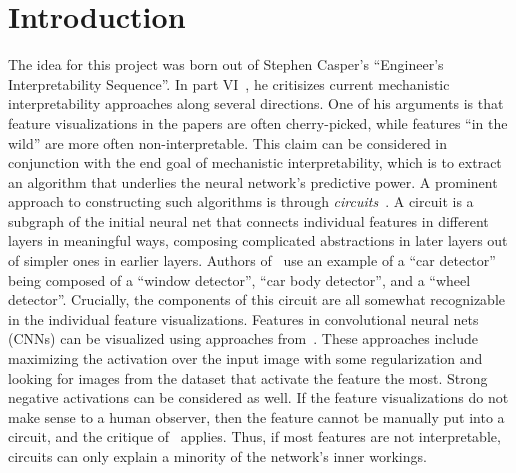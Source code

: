 \documentclass[12pt]{article}
\begin{document}
\section{Introduction}
The idea for this project was born out of Stephen Casper's ``Engineer's Interpretability Sequence''. In part VI~\cite{cas2023interpretability}, he critisizes current mechanistic interpretability approaches along several directions. One of his arguments is that feature visualizations in the papers are often cherry-picked, while features ``in the wild'' are more often non-interpretable. This claim can be considered in conjunction with the end goal of mechanistic interpretability, which is to extract an algorithm that underlies the neural network's predictive power. 
A prominent approach to constructing such algorithms is through \emph{circuits}~\cite{olah2020zoom}. A circuit is a subgraph of the initial neural net that connects individual features in different layers in meaningful ways, composing complicated abstractions in later layers out of simpler ones in earlier layers. Authors of~\cite{olah2020zoom} use an example of a ``car detector'' being composed of a ``window detector'', ``car body detector'', and a ``wheel detector''. Crucially, the components of this circuit are all somewhat recognizable in the individual feature visualizations. Features in convolutional neural nets (CNNs) can be visualized using approaches from~\cite{olah2017feature}. These approaches include maximizing the activation over the input image with some regularization and looking for images from the dataset that activate the feature the most. Strong negative activations can be considered as well. If the feature visualizations do not make sense to a human observer, then the feature cannot be manually put into a circuit, and the critique of~\cite{cas2023interpretability} applies. Thus, if most features are not interpretable, circuits can only explain a minority of the network's inner workings.
\end{document}
